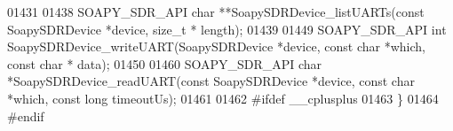 \begin{DoxyCode}
01431 
01438 SOAPY_SDR_API \textcolor{keywordtype}{char} **SoapySDRDevice_listUARTs(\textcolor{keyword}{const} SoapySDRDevice *device, \textcolor{keywordtype}{size\_t} *
      length);
01439 
01449 SOAPY_SDR_API \textcolor{keywordtype}{int} SoapySDRDevice_writeUART(SoapySDRDevice *device, \textcolor{keyword}{const} \textcolor{keywordtype}{char} *which, \textcolor{keyword}{const} \textcolor{keywordtype}{char} *
      data);
01450 
01460 SOAPY_SDR_API \textcolor{keywordtype}{char} *SoapySDRDevice_readUART(\textcolor{keyword}{const} SoapySDRDevice *device, \textcolor{keyword}{const} \textcolor{keywordtype}{char} *which, \textcolor{keyword}{const} \textcolor{keywordtype}{long} 
      timeoutUs);
01461 
01462 \textcolor{preprocessor}{#ifdef \_\_cplusplus}
01463 \}
01464 \textcolor{preprocessor}{#endif}
\end{DoxyCode}
